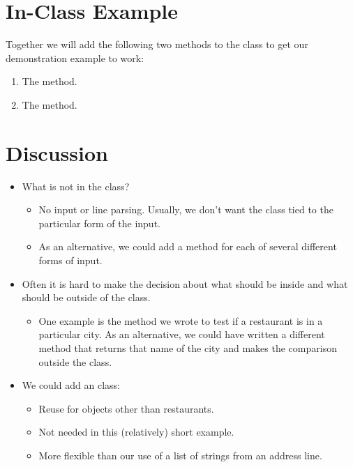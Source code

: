 \documentclass[letterpaper,10pt,english]{sphinxmanual}
\begin{document}
\section{In-Class Example}
\label{\detokenize{lecture_notes/lec19_classes2:in-class-example}}
Together we will add the following two methods to the 
class to get our demonstration example to work:
\begin{enumerate}
\def\theenumi{\arabic{enumi}}
\def\labelenumi{\theenumi .}
\makeatletter\def\p@enumii{\p@enumi \theenumi .}\makeatother
\item {} 
The  method.

\item {} 
The  method.

\end{enumerate}


\section{Discussion}
\label{\detokenize{lecture_notes/lec19_classes2:discussion}}\begin{itemize}
\item {} 
What is not in the  class?
\begin{itemize}
\item {} 
No input or line parsing. Usually, we don’t want the class tied to
the particular form of the input.

\item {} 
As an alternative, we could add a method for each of several
different forms of input.

\end{itemize}

\item {} 
Often it is hard to make the decision about what should be inside and
what should be outside of the class.
\begin{itemize}
\item {} 
One example is the method we wrote to test if
a restaurant is in a particular city. As an alternative, we could
have written a
different method that returns that name of the city and makes the
comparison outside the class.

\end{itemize}

\item {} 
We could add an  class:
\begin{itemize}
\item {} 
Reuse for objects other than restaurants.

\item {} 
Not needed in this (relatively) short example.

\item {} 
More flexible than our use of a list of strings from an address
line.

\end{itemize}

\end{itemize}
\end{document}
